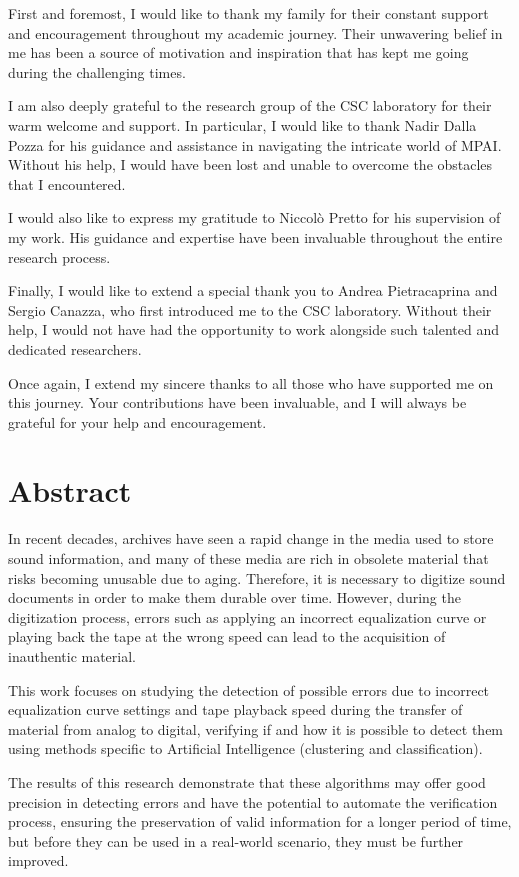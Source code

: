 First and foremost, I would like to thank my family for their constant support and encouragement throughout my academic journey. Their unwavering belief in me has been a source of motivation and inspiration that has kept me going during the challenging times.

I am also deeply grateful to the research group of the CSC laboratory for their warm welcome and support. In particular, I would like to thank Nadir Dalla Pozza for his guidance and assistance in navigating the intricate world of MPAI. Without his help, I would have been lost and unable to overcome the obstacles that I encountered.

I would also like to express my gratitude to Niccolò Pretto for his supervision of my work. His guidance and expertise have been invaluable throughout the entire research process.

Finally, I would like to extend a special thank you to Andrea Pietracaprina and Sergio Canazza, who first introduced me to the CSC laboratory. Without their help, I would not have had the opportunity to work alongside such talented and dedicated researchers.

Once again, I extend my sincere thanks to all those who have supported me on this journey. Your contributions have been invaluable, and I will always be grateful for your help and encouragement.

\null
\thispagestyle{empty}
\newpage

\chapter*{Abstract}

In recent decades, archives have seen a rapid change in the media used to store sound information, and many of these media are rich in obsolete material that risks becoming unusable due to aging. Therefore, it is necessary to digitize sound documents in order to make them durable over time. However, during the digitization process, errors such as applying an incorrect equalization curve or playing back the tape at the wrong speed can lead to the acquisition of inauthentic material.

This work focuses on studying the detection of possible errors due to incorrect equalization curve settings and tape playback speed during the transfer of material from analog to digital, verifying if and how it is possible to detect them using methods specific to Artificial Intelligence (clustering and classification).

The results of this research demonstrate that these algorithms may offer good precision in detecting errors and have the potential to automate the verification process, ensuring the preservation of valid information for a longer period of time, but before they can be used in a real-world scenario, they must be further improved.

\null
\thispagestyle{empty}
\newpage

\blankpage
